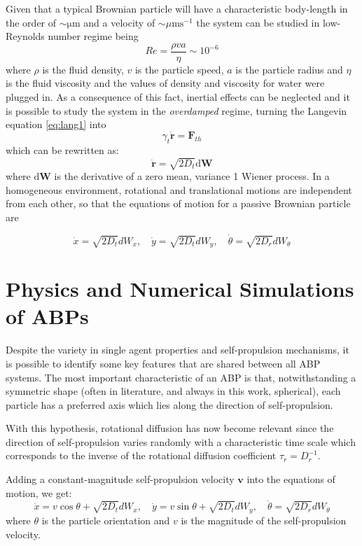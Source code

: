 \documentclass[../../master_thesis_np.tex]{subfiles}
\begin{document}
	Given that a typical Brownian particle will have a characteristic body-length in the order of $ \mathrm{\sim\mu m}$ and a velocity of $\sim\mu \mathrm{m s}^{-1}$ the system can be studied in low-Reynolds number regime being 
	\[Re = \frac{\rho v a}{\eta} \sim 10^{-6} \]  
	where $\rho$ is the fluid density, $v$ is the particle speed, $a$ is the particle radius and $\eta$ is the fluid viscosity and the values of density and viscosity for water were plugged in. As a consequence of this fact, inertial effects can be neglected and it is possible to study the system in the \emph{overdamped} regime, turning the Langevin equation \ref{eq:lang1} into
	\begin{equation} \label{eq:lang2}
		\gamma_t \mathbf{\dot{r}} = \mathbf{F}_{th}
	\end{equation}
	which can be rewritten as:
	\begin{equation}
		\mathbf{\dot{r}} = \sqrt{2D_t}\mathrm{d}\mathbf{W}
	\end{equation}
	where $\mathrm{d}\mathbf{W}$ is the derivative of a zero mean, variance 1 Wiener process.
	In a homogeneous environment, rotational and translational motions are independent from each other, so that the equations of motion for a passive Brownian particle are
	
	\begin{equation}
		\dot{x} = \sqrt{2D_t}dW_x, \quad \dot{y} = \sqrt{2D_t}dW_y, \quad \dot{\theta} = \sqrt{2D_r}dW_{\theta}
	\end{equation}

	\section[ABP simulations]{Physics and Numerical Simulations of ABPs}
	Despite the variety in single agent properties and self-propulsion mechanisms, it is possible to identify some key features that are shared between all ABP systems. The most important characteristic of an ABP is that, notwithstanding a symmetric shape (often in literature, and always in this work, spherical), each particle has a preferred axis which lies along the direction of self-propulsion.
	
	With this hypothesis, rotational diffusion has now become relevant since the direction of self-propulsion varies randomly with a characteristic time scale which corresponds to the inverse of the rotational diffusion coefficient $\tau_r = D_r^{-1}$. 
	
	Adding a constant-magnitude self-propulsion velocity $\mathbf{v}$ into the equations of motion, we get:
	\begin{equation}
		\dot{x} = v \cos{\theta} + \sqrt{2D_t}dW_x , \quad \dot{y} = v \sin{\theta} + \sqrt{2D_t}dW_y, \quad \dot{\theta} = \sqrt{2D_r}dW_{\theta}
	\end{equation}
	where $\theta$ is the particle orientation and $v$ is the magnitude of the self-propulsion velocity.
	
\end{document}

